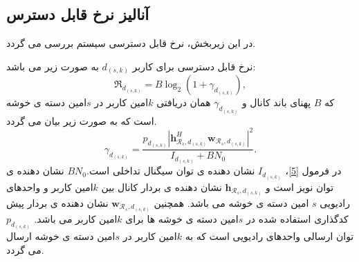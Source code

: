  \subsection{آنالیز نرخ قابل دسترس}
در این زیربخش، نرخ قابل دسترسی سیستم بررسی می گردد.
\begin{theorem}\label{t1}
 نرخ قابل دسترسی برای کاربر $d_{(s,k)}$ به صورت زیر می باشد:
\begin{equation}\label{e1}
\mathfrak{R}_{d_{(s,k)}} = B \log_2(1+\gamma_{d_{(s,k)}}),
\end{equation}
که $B$ پهنای باند کانال و $\gamma_{d_{(s,k)}}$ همان  دریافتی $k$امین کاربر در $s$امین دسته ی خوشه است که به صورت زیر بیان می گردد.  
\begin{equation}\label{5}
\gamma_{d_{(s,k)}}= \frac{p_{d_{(s,k)}}|\boldsymbol{h}_{\mathcal{R}_s, d_{(s,k)}}^H \boldsymbol{w}_{\mathcal{R}_{s},d_{(s,k)}}|^2}{I_{d_{(s,k)}}+BN_0}.
\end{equation}
در فرمول \eqref{5}، 
$I_{d_{(s,k)}}$
نشان دهنده ی توان سیگنال تداخلی است.$BN_0$
نشان دهنده ی توان نویز است و
$\boldsymbol{h}_{\mathcal{R}_s, d_{(s,k)}}$ 
 نشان دهنده ی بردار کانال بین $k$امین کاربر و واحدهای رادیویی
 $s$
 امین دسته ی خوشه می باشد. همچنین 
 $\boldsymbol{w}_{\mathcal{R}_{s},d_{(s,k)}}$
 نشان دهنده ی بردار پیش کدگذاری استفاده شده در $s$امین دسته ی خوشه ها برای $k$امین کاربر می باشد. 
 $p_{d_{(s,k)}}$
 توان ارسالی واحدهای رادیویی است که به $k$امین کاربر در $s$امین دسته ی خوشه ارسال می گردد.
\end{theorem}
